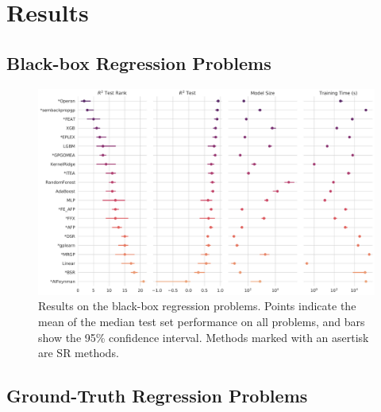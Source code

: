 \section{Results}

\subsection{Black-box Regression Problems}
\begin{figure}
    \includegraphics[width=\textwidth]{figs/results_pmlb_r1/pairgrid-pointplot_r2_test_rank_r2_test_model_size_training-time-(s).pdf}
    \caption{ 
        Results on the black-box regression problems.
        Points indicate the mean of the median test set performance on all problems, and bars show the 95\% confidence interval. 
        Methods marked with an asertisk are SR methods. 
    }
    \label{fig:pmlb_perf}
\end{figure}

\subsection{Ground-Truth Regression Problems}

